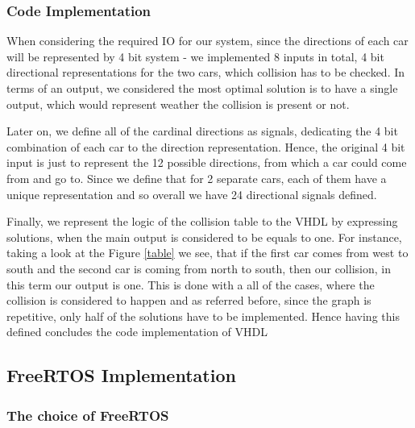\documentclass[conference]{IEEEtran}
\begin{document}
\subsubsection{Code Implementation}

When considering the required IO for our system, since the directions of each car will be represented by 4 bit system - we implemented 8 inputs in total, 4 bit directional representations for the two cars, which collision has to be checked. In terms of an output, we considered the most optimal solution is to have a single output, which would represent weather the collision is present or not.

Later on, we define all of the cardinal directions as signals, dedicating the 4 bit combination of each car to the direction representation. Hence, the original 4 bit input is just to represent the 12 possible directions, from which a car could come from and go to. Since we define that for 2 separate cars, each of them have a unique representation and so overall we have 24 directional signals defined.

Finally, we represent the logic of the collision table to the VHDL by expressing solutions, when the main output is considered to be equals to one. For instance, taking a look at the Figure \ref{table} we see, that if the first car comes from west to south and the second car is coming from north to south, then our collision, in this term our output is one. This is done with a all of the cases, where the collision is considered to happen and as referred before, since the graph is repetitive, only half of the solutions have to be implemented. Hence having this defined concludes the code implementation of VHDL

\subsection{FreeRTOS Implementation}

\subsubsection{The choice of FreeRTOS}
\end{document}
